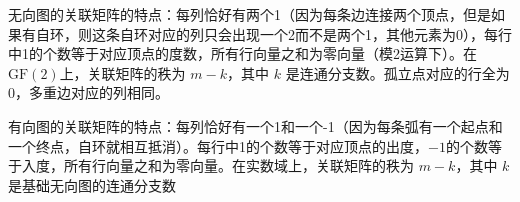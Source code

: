 无向图的关联矩阵的特点：每列恰好有两个1（因为每条边连接两个顶点，但是如果有自环，则这条自环对应的列只会出现一个2而不是两个1，其他元素为0），每行中1的个数等于对应顶点的度数，所有行向量之和为零向量（模2运算下）。在$\mathrm{GF}(2)$上，关联矩阵的秩为 $m - k$，其中 $k$ 是连通分支数。孤立点对应的行全为0，多重边对应的列相同。

有向图的关联矩阵的特点：每列恰好有一个1和一个-1（因为每条弧有一个起点和一个终点，自环就相互抵消）。每行中1的个数等于对应顶点的出度，$-1$的个数等于入度，所有行向量之和为零向量。在实数域上，关联矩阵的秩为 $m - k$，其中 $k$ 是基础无向图的连通分支数














\newpage
